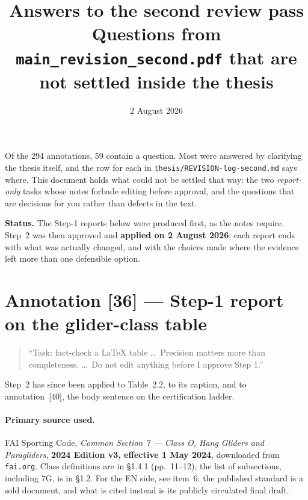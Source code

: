 \documentclass[11pt,a4paper]{article}
\title{\textbf{Answers to the second review pass}\\[2pt]
  \large Questions from \texttt{main\_revision\_second.pdf} that are not settled inside the thesis}
\author{}
\date{2 August 2026}
\newcommand{\note}[1]{\begingroup\small\color{qcol}\begin{quote}#1\end{quote}\endgroup}
\begin{document}
\maketitle
\vspace{-2.2em}

\noindent
Of the 294 annotations, 59 contain a question. Most were answered by clarifying the thesis
itself, and the row for each in \texttt{thesis/REVISION-log-second.md} says where. This
document holds what could not be settled that way: the two \emph{report-only} tasks whose
notes forbade editing before approval, and the questions that are decisions for you rather
than defects in the text.

\medskip\noindent
\textbf{Status.} The Step-1 reports below were produced first, as the notes require. Step~2
was then approved and \textbf{applied on 2 August 2026}; each report ends with what was
actually changed, and with the choices made where the evidence left more than one
defensible option.

\section{Annotation [36] --- Step-1 report on the glider-class table}

\note{\enquote{Task: fact-check a LaTeX table \dots\ Precision matters more than
completeness. \dots\ Do not edit anything before I approve Step 1.}}

\noindent
Step~2 has since been applied to Table~2.2, to its caption, and to annotation~[40], the
body sentence on the certification ladder.

\paragraph{Primary source used.} FAI Sporting Code, \emph{Common Section 7 --- Class O,
Hang Gliders and Paragliders}, \textbf{2024 Edition v3, effective 1 May 2024}, downloaded
from \texttt{fai.org}. Class definitions are in \S1.4.1 (pp.~11--12); the list of
subsections, including 7G, is in \S1.2. For the EN side, see item~6: the published
standard is a sold document, and what is cited instead is its publicly circulated final
draft.
\end{document}
